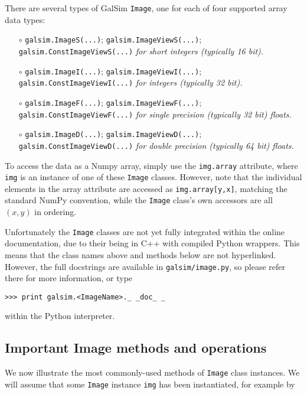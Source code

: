 \documentclass[preprint,11pt]{aastex}
\begin{document}
There are several types of GalSim \texttt{Image}, one for each of four
supported array data types:
\begin{itemize}

\item[$\circ$] \texttt{galsim.ImageS(...)}; \texttt{galsim.ImageViewS(...)};
  \texttt{galsim.ConstImageViewS(...)} \newline \emph{for short integers (typically 16 bit).}

\item[$\circ$] \texttt{galsim.ImageI(...)}; \texttt{galsim.ImageViewI(...)};
  \texttt{galsim.ConstImageViewI(...)} \newline \emph{for integers (typically 32 bit).}

\item[$\circ$] \texttt{galsim.ImageF(...)}; \texttt{galsim.ImageViewF(...)};
  \texttt{galsim.ConstImageViewF(...)} \newline \emph{for single precision (typically 32 bit)
  floats.}

\item[$\circ$] \texttt{galsim.ImageD(...)}; \texttt{galsim.ImageViewD(...)};
  \texttt{galsim.ConstImageViewD(...)} \newline \emph{for double precision (typically 64 bit)
  floats.}

\end{itemize}
To access the data as a Numpy array, simply use the \texttt{img.array}
attribute, where \texttt{img} is an instance of one of these
\texttt{Image} classes.  However, note that the individual elements in
the array attribute are accessed as \texttt{img.array[y,x]}, matching
the standard NumPy convention, while the \texttt{Image} class's own
accessors are all $(x,y)$ in ordering.

Unfortunately the \texttt{Image} classes are not yet fully integrated
within the online documentation, due to their being in C++ with
compiled Python wrappers.  This means that the class names above and
methods below are not hyperlinked.  However, the full docstrings are
available in \texttt{galsim/image.py}, so please refer there for more
information, or type

{\tt >>> print galsim.<ImageName>.\_\,\_doc\_\,\_}

within the Python interpreter.

\subsection{Important Image methods and operations}\label{sect:imagemethods}
We now illustrate the most commonly-used methods of \texttt{Image}
class instances.  We will assume that some \texttt{Image} instance
\texttt{img} has been instantiated, for example by
\end{document}
